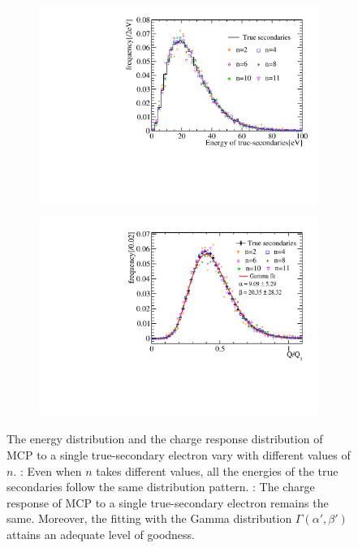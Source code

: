 \begin{figure}[!htbp]
	\centering
	\begin{subfigure}{0.5\textwidth}
		\centering
		\includegraphics[width=0.95\linewidth]{PMTRelated/GTmodel/single_pecharge.pdf}
		\caption{}
		\label{fig:single_pe}
	\end{subfigure}%
	\hfill
	\begin{subfigure}{0.5\textwidth}
		\centering
		\includegraphics[width=0.95\linewidth]{PMTRelated/GTmodel/singlepefit.pdf}
		\caption{}
		\label{fig:single_fit}
	\end{subfigure}
	\caption{The energy distribution and the charge response distribution of MCP to a single true-secondary electron vary with different values of \(n\). : Even when \(n\) takes different values, all the energies of the true secondaries follow the same distribution pattern. : The charge response of MCP to a single true-secondary electron remains the same. Moreover, the fitting with the Gamma distribution \(\varGamma(\alpha',\beta')\) attains an adequate level of goodness. }
	\label{fig:singlepe}
\end{figure}

